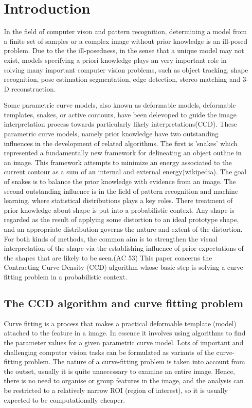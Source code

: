 \chapter{Introduction}
\label{chapter:Introduction}
In the field of computer vison and pattern recognition, determining a
model from a finite set of samples or a complex image without prior
knowledge is an ill-posed problem. Due to the the ill-posedness, in
the sense that a unique model may not exist, models specifying a priori
knowledge plays an very important role in solving many important
computer vision problems, such as object tracking, shape recognition,
pose estimation segmentation, edge detection, stereo matching and 3-D
reconstruction.

Some parametric curve models, also known as deformable models,
deformable templates, snakes, or active contours, have been delevoped
to guide the image interpretation process towards particularly
likely interpretations(CCD). These parametric curve models, namely
prior knowledge have two outstanding influences in the
development of related algorithms. The first is 'snakes' which
represented a fundamentally new framework for delineating an object
outline in an image. This framework attempts to minimize an energy
associated to the current contour as a sum of an internal and external
energy(wikipedia). The goal of snakes is to balance the prior
knowledge with evidence from an image. The second outstanding
influence is in the field of pattern recognition and machine learning,
where statistical distributions plays a key roles.  There treatment
of prior knowledge about shape is put into a probabilistic
context. Any shape is regarded as the result of applying some
distortion to an ideal prototype shape, and an appropriate
distribution governs the nature and extent of the distortion.
For both kinds of methods, the common aim is to strengthen the visual
interpretation of the shape via the establishing influence of prior
expectations of the shapes that are likely to be seen.(AC 53) This
paper concerns the Contracting Curve Density (CCD) algorithm whose
basic step is solving a curve fitting problem in a probabilistic
context.


\section{The CCD algorithm and curve fitting problem}
\label{sec:ccdcfp}
Curve fitting is a process that makes
a practical deformable template (model) attached to the feature in a
image. In essence it involves using algorithms to find the parameter
values for a given parametric curve model. Lots of important and
challenging computer vision tasks can be formulated as variants of the
curve-fitting problem. The nature of a curve-fitting problem is taken into account from the
outset, usually it is quite unnecessary to examine an entire
image. Hence, there is no need to organise or group features in the
image, and the analysis can be restricted to a relatively narrow
ROI (region of interest), so it is usually expected to be computationally
cheaper.

